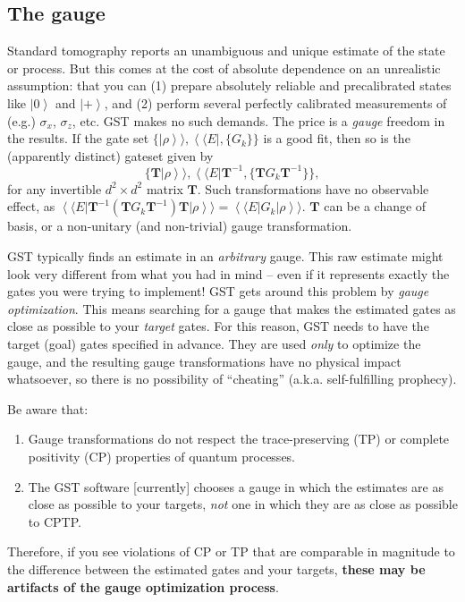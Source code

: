 \documentclass{article}[11pt]
\newcommand{\rrangle}{\rangle\!\rangle} \newcommand{\llangle}{\langle\!\langle}
\newcommand{\ket}[1]{\ensuremath{\left|#1\right\rangle}}
\newcommand{\sket}[1]{\ensuremath{\left|#1\right\rrangle}}
\newcommand{\sbra}[1]{\ensuremath{\left\llangle#1\right|}}
\begin{document}
\subsection{The gauge}

Standard tomography reports an unambiguous and unique estimate of the state or process.  But this comes at the cost of absolute dependence on an unrealistic assumption:  that you can (1) prepare absolutely reliable and precalibrated states like $\ket{0}$ and $\ket{+}$, and (2) perform several perfectly calibrated measurements of (e.g.) $\sigma_x$, $\sigma_z$, etc.  GST makes no such demands.  The price is a \emph{gauge} freedom in the results.  If the gate set $\{\sket{\rho},\sbra{E},\{G_k\}\}$ is a good fit, then so is the (apparently distinct) gateset given by
\begin{equation}
\{\mathbf{T}\sket{\rho},\sbra{E}\mathbf{T}^{-1},\{\mathbf{T}G_k\mathbf{T}^{-1}\}\},
\end{equation}
for any invertible $d^2\times d^2$ matrix $\mathbf{T}$.  Such transformations have no observable effect, as $\sbra{E} \mathbf{T}^{-1} \left(\mathbf{T} G_k \mathbf{T}^{-1}\right) \mathbf{T} \sket{\rho} = \sbra{E} G_k \sket{\rho}$.  $\mathbf{T}$ can be a change of basis, or a non-unitary (and non-trivial) gauge transformation.

GST typically finds an estimate in an \emph{arbitrary} gauge.  This raw estimate might look very different from what you had in mind -- even if it represents exactly the gates you were trying to implement!  GST gets around this problem by \emph{gauge optimization}.  This means searching for a gauge that makes the estimated gates as close as possible to your \emph{target} gates.  For this reason, GST needs to have the target (goal) gates specified in advance.  They are used \emph{only} to optimize the gauge, and the resulting gauge transformations have no physical impact whatsoever, so there is no possibility of ``cheating'' (a.k.a. self-fulfilling prophecy).

Be aware that:
\begin{enumerate}
\item Gauge transformations do not respect the trace-preserving (TP) or complete positivity (CP) properties of quantum processes.
\item The GST software [currently] chooses a gauge in which the estimates are as close as possible to your targets, \emph{not} one in which they are as close as possible to CPTP.
\end{enumerate}
Therefore, if you see violations of CP or TP that are comparable in magnitude to the difference between the estimated gates and your targets, \textbf{these may be artifacts of the gauge optimization process}.
\end{document}
